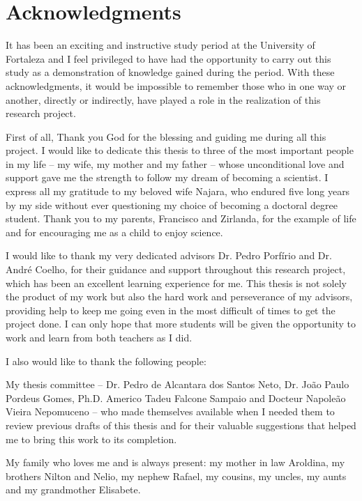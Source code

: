 \chapter*{Acknowledgments} 



It has been an exciting and instructive study period at the University of Fortaleza and I feel privileged to have had the opportunity to carry out this study as a demonstration of
knowledge gained during the period. With these acknowledgments, it would be impossible to remember those who in one way or another, directly or indirectly, have played a role in the realization of this research project. 

First of all, Thank you God for the blessing and guiding me during all this project. I would like to dedicate this thesis to three of the most important people in my life
– my wife, my mother and my father – whose unconditional love and support gave me the
strength to follow my dream of becoming a scientist. I express all my gratitude to my beloved wife Najara, who endured five long years by my side without ever questioning my choice of becoming a doctoral degree student. Thank you to my parents, Francisco and Zirlanda,  for the example of life and for encouraging me as a child to enjoy science.

I would like to thank my very dedicated advisors Dr. Pedro Porfírio and Dr. André Coelho, for their guidance and support throughout this research project, which has been an excellent
learning experience for me. This thesis is not solely the product of my work but also the hard work and perseverance of my advisors, providing help to keep me going even in the most difficult of times to get the project done. I can only hope that more students will be given the opportunity to work and learn from both teachers as I did.

I also would like to thank the following people:

My thesis committee – Dr. Pedro de Alcantara dos Santos Neto, Dr. João Paulo Pordeus Gomes, Ph.D. Americo Tadeu Falcone Sampaio and Docteur Napoleão Vieira Nepomuceno – who made themselves available when I needed them to review previous drafts of this thesis and for their valuable suggestions that helped me to bring this work to its completion.

My family who loves me and is always present: my mother in law Aroldina, my brothers Nilton and Nelio, my nephew Rafael, my cousins, my uncles, my aunts and my grandmother Elisabete.

